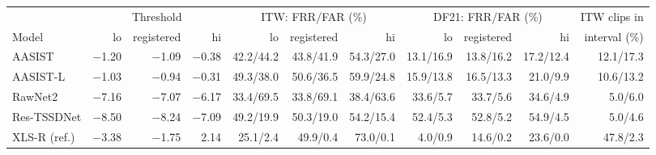 \begin{tabular}{@{}lrrrrrrrrrr@{}}
\toprule
 & \multicolumn{3}{c}{Threshold} & \multicolumn{3}{c}{ITW: FRR/FAR (\%)} & \multicolumn{3}{c}{DF21: FRR/FAR (\%)} & ITW clips in \\
\cmidrule(lr){2-4}\cmidrule(lr){5-7}\cmidrule(lr){8-10}
Model & lo & registered & hi & lo & registered & hi & lo & registered & hi & interval (\%) \\
\midrule
AASIST & $-$1.20 & $-$1.09 & $-$0.38 & 42.2/44.2 & 43.8/41.9 & 54.3/27.0 & 13.1/16.9 & 13.8/16.2 & 17.2/12.4 & 12.1/17.3 \\
AASIST-L & $-$1.03 & $-$0.94 & $-$0.31 & 49.3/38.0 & 50.6/36.5 & 59.9/24.8 & 15.9/13.8 & 16.5/13.3 & 21.0/9.9 & 10.6/13.2 \\
RawNet2 & $-$7.16 & $-$7.07 & $-$6.17 & 33.4/69.5 & 33.8/69.1 & 38.4/63.6 & 33.6/5.7 & 33.7/5.6 & 34.6/4.9 & 5.0/6.0 \\
Res-TSSDNet & $-$8.50 & $-$8.24 & $-$7.09 & 49.2/19.9 & 50.3/19.0 & 54.2/15.4 & 52.4/5.3 & 52.8/5.2 & 54.9/4.5 & 5.0/4.6 \\
XLS-R (ref.) & $-$3.38 & $-$1.75 & 2.14 & 25.1/2.4 & 49.9/0.4 & 73.0/0.1 & 4.0/0.9 & 14.6/0.2 & 23.6/0.0 & 47.8/2.3 \\
\bottomrule
\end{tabular}
